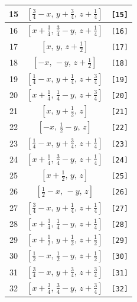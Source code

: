 \documentclass[fleqn,8pt]{jsarticle}
\begin{document}
\begin{longtable}{ccc}
15 & $\left[ \frac{3}{4} - x,\, y + \frac{3}{4},\, z + \frac{1}{4} \right]$ & {\tt [15]} \\ \hline
16 & $\left[ x + \frac{3}{4},\, \frac{3}{4} - y,\, z + \frac{1}{4} \right]$ & {\tt [16]} \\ \hline
17 & $\left[ x,\, y,\, z + \frac{1}{2} \right]$ & {\tt [17]} \\ \hline
18 & $\left[ - x,\, - y,\, z + \frac{1}{2} \right]$ & {\tt [18]} \\ \hline
19 & $\left[ \frac{1}{4} - x,\, y + \frac{1}{4},\, z + \frac{3}{4} \right]$ & {\tt [19]} \\ \hline
20 & $\left[ x + \frac{1}{4},\, \frac{1}{4} - y,\, z + \frac{3}{4} \right]$ & {\tt [20]} \\ \hline
21 & $\left[ x,\, y + \frac{1}{2},\, z \right]$ & {\tt [21]} \\ \hline
22 & $\left[ - x,\, \frac{1}{2} - y,\, z \right]$ & {\tt [22]} \\ \hline
23 & $\left[ \frac{1}{4} - x,\, y + \frac{3}{4},\, z + \frac{1}{4} \right]$ & {\tt [23]} \\ \hline
24 & $\left[ x + \frac{1}{4},\, \frac{3}{4} - y,\, z + \frac{1}{4} \right]$ & {\tt [24]} \\ \hline
25 & $\left[ x + \frac{1}{2},\, y,\, z \right]$ & {\tt [25]} \\ \hline
26 & $\left[ \frac{1}{2} - x,\, - y,\, z \right]$ & {\tt [26]} \\ \hline
27 & $\left[ \frac{3}{4} - x,\, y + \frac{1}{4},\, z + \frac{1}{4} \right]$ & {\tt [27]} \\ \hline
28 & $\left[ x + \frac{3}{4},\, \frac{1}{4} - y,\, z + \frac{1}{4} \right]$ & {\tt [28]} \\ \hline
29 & $\left[ x + \frac{1}{2},\, y + \frac{1}{2},\, z + \frac{1}{2} \right]$ & {\tt [29]} \\ \hline
30 & $\left[ \frac{1}{2} - x,\, \frac{1}{2} - y,\, z + \frac{1}{2} \right]$ & {\tt [30]} \\ \hline
31 & $\left[ \frac{3}{4} - x,\, y + \frac{3}{4},\, z + \frac{3}{4} \right]$ & {\tt [31]} \\ \hline
32 & $\left[ x + \frac{3}{4},\, \frac{3}{4} - y,\, z + \frac{3}{4} \right]$ & {\tt [32]} \\
\end{longtable}
\end{document}
